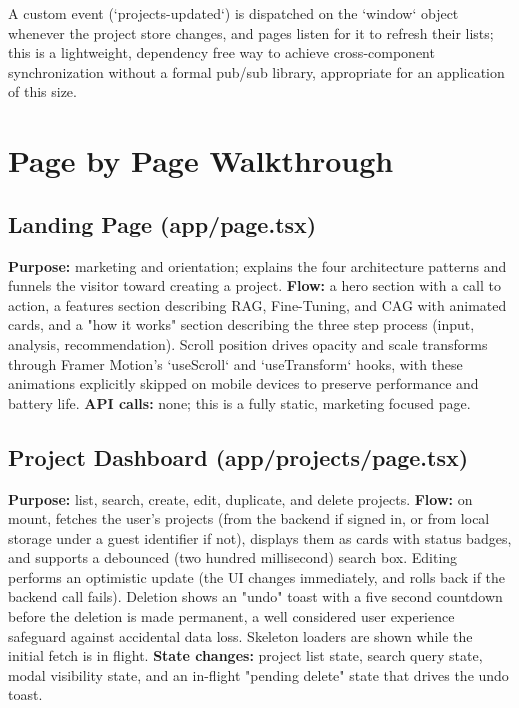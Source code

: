 \documentclass[11pt,a4paper]{report}
\begin{document}
A custom event (`projects-updated`) is dispatched on the `window` object whenever the project store changes, and pages listen for it to refresh their lists; this is a lightweight, dependency free way to achieve cross-component synchronization without a formal pub/sub library, appropriate for an application of this size.

\section{Page by Page Walkthrough}

\subsection{Landing Page (app/page.tsx)}
\textbf{Purpose:} marketing and orientation; explains the four architecture patterns and funnels the visitor toward creating a project.
\textbf{Flow:} a hero section with a call to action, a features section describing RAG, Fine-Tuning, and CAG with animated cards, and a "how it works" section describing the three step process (input, analysis, recommendation). Scroll position drives opacity and scale transforms through Framer Motion's `useScroll` and `useTransform` hooks, with these animations explicitly skipped on mobile devices to preserve performance and battery life.
\textbf{API calls:} none; this is a fully static, marketing focused page.

\subsection{Project Dashboard (app/projects/page.tsx)}
\textbf{Purpose:} list, search, create, edit, duplicate, and delete projects.
\textbf{Flow:} on mount, fetches the user's projects (from the backend if signed in, or from local storage under a guest identifier if not), displays them as cards with status badges, and supports a debounced (two hundred millisecond) search box. Editing performs an optimistic update (the UI changes immediately, and rolls back if the backend call fails). Deletion shows an "undo" toast with a five second countdown before the deletion is made permanent, a well considered user experience safeguard against accidental data loss. Skeleton loaders are shown while the initial fetch is in flight.
\textbf{State changes:} project list state, search query state, modal visibility state, and an in-flight "pending delete" state that drives the undo toast.
\end{document}
